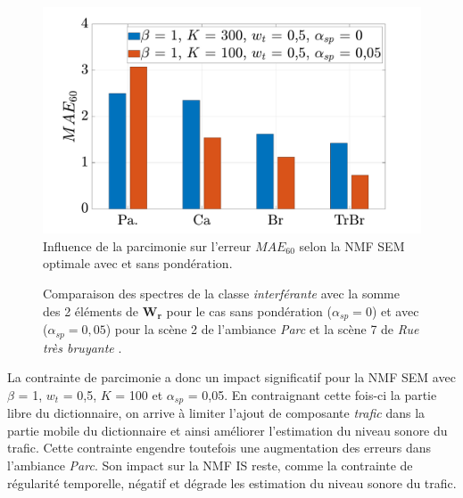 \begin{figure}[h]
\centering
\includegraphics[width=.7\linewidth]{./figures/resultats/bar_sparse.pdf}
\caption{Influence de la parcimonie sur l'erreur $MAE_{60}$ selon la NMF SEM optimale avec et sans pondération.}
\label{fig:erreurSparseDetails}
\end{figure}

\begin{figure}[h!]
\centering
{}%
\qquad
{}%
\caption{Comparaison des spectres de la classe \textit{interférante} avec la somme des 2 éléments de $\mathbf{W_r}$ pour le cas sans pondération ($\alpha_{sp}= 0$) et avec ($\alpha_{sp} = 0,05$) pour la scène 2 de l'ambiance \textit{Parc}  et la scène 7 de \textit{Rue très bruyante} .}
\label{fig:grafic_sp}
\end{figure}

La contrainte de parcimonie a donc un impact significatif pour la NMF SEM avec $\beta$ = 1, $w_t$ = 0,5, $K$ = 100 et $\alpha_{sp}$ = 0,05. En contraignant cette fois-ci la partie libre du dictionnaire, on arrive à limiter l'ajout de composante \textit{trafic} dans la partie mobile du dictionnaire et ainsi améliorer l'estimation du niveau sonore du trafic. Cette contrainte engendre toutefois une augmentation des erreurs dans l'ambiance \textit{Parc}. Son impact sur la NMF IS reste, comme la contrainte de régularité temporelle, négatif et dégrade les estimation du niveau sonore du trafic.